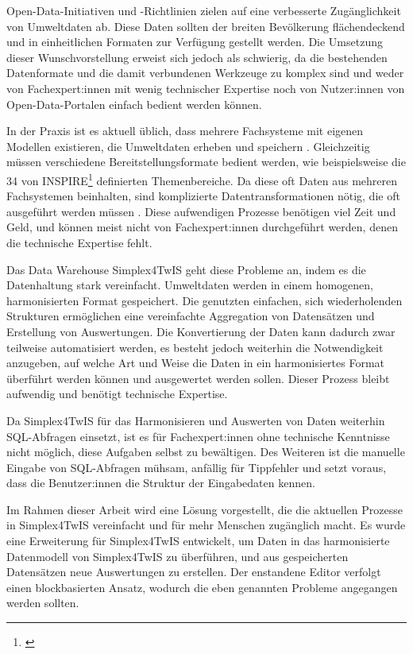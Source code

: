 Open-Data-Initiativen und -Richtlinien zielen auf eine verbesserte Zugänglichkeit von Umweltdaten ab. Diese Daten sollten der breiten Bevölkerung flächendeckend und in einheitlichen Formaten zur Verfügung gestellt werden. Die Umsetzung dieser Wunschvorstellung erweist sich jedoch als schwierig, da die bestehenden Datenformate und die damit verbundenen Werkzeuge zu komplex sind und weder von Fachexpert:innen mit wenig technischer Expertise noch von Nutzer:innen von Open-Data-Portalen einfach bedient werden können.

In der Praxis ist es aktuell üblich, dass mehrere Fachsysteme mit eigenen Modellen existieren, die Umweltdaten erheben und speichern \parencite{rudolfUnsereDaten2022}. Gleichzeitig müssen verschiedene Bereitstellungsformate bedient werden, wie beispielsweise die 34 von INSPIRE\footnote{\textcite{inspireRichtlinie20072007}} definierten Themenbereiche. Da diese oft Daten aus mehreren Fachsystemen beinhalten, sind komplizierte Datentransformationen nötig, die oft ausgeführt werden müssen \parencite{grossmannEnvVisioUniverselle2021}. Diese aufwendigen Prozesse benötigen viel Zeit und Geld, und können meist nicht von Fachexpert:innen durchgeführt werden, denen die technische Expertise fehlt.

\pskip
Das Data Warehouse Simplex4TwIS geht diese Probleme an, indem es die Datenhaltung stark vereinfacht. Umweltdaten werden in einem homogenen, harmonisierten Format gespeichert. Die genutzten einfachen, sich wiederholenden Strukturen ermöglichen eine vereinfachte Aggregation von Datensätzen und Erstellung von Auswertungen. Die Konvertierung der Daten kann dadurch zwar teilweise automatisiert werden, es besteht jedoch weiterhin die Notwendigkeit anzugeben, auf welche Art und Weise die Daten in ein harmonisiertes Format überführt werden können und ausgewertet werden sollen. Dieser Prozess bleibt aufwendig und benötigt technische Expertise.

Da Simplex4TwIS für das Harmonisieren und Auswerten von Daten weiterhin \acs{SQL}-Abfragen einsetzt, ist es für Fachexpert:innen ohne technische Kenntnisse nicht möglich, diese Aufgaben selbst zu bewältigen. Des Weiteren ist die manuelle Eingabe von \acs{SQL}-Abfragen mühsam, anfällig für Tippfehler und setzt voraus, dass die Benutzer:innen die Struktur der Eingabedaten kennen.

\pskip
Im Rahmen dieser Arbeit wird eine Lösung vorgestellt, die die aktuellen Prozesse in Simplex4TwIS vereinfacht und für mehr Menschen zugänglich macht. Es wurde eine Erweiterung für Simplex4TwIS entwickelt, um Daten in das harmonisierte Datenmodell von Simplex4TwIS zu überführen, und aus gespeicherten Datensätzen neue Auswertungen zu erstellen. Der enstandene Editor verfolgt einen blockbasierten Ansatz, wodurch die eben genannten Probleme angegangen werden sollten.

